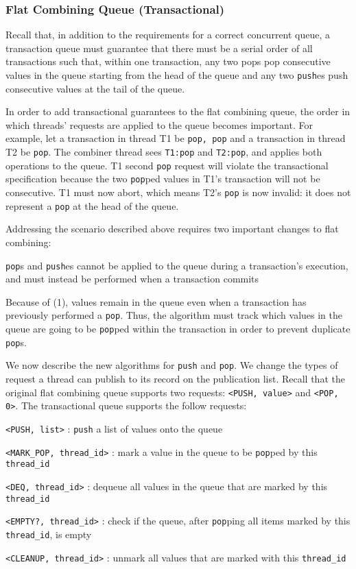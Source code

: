 \subsubsection{Flat Combining Queue (Transactional)}

Recall that, in addition to the requirements for a correct concurrent queue, a transaction queue must guarantee that there must be a serial order of all transactions such that, within one transaction, any two pops pop consecutive values in the queue starting from the head of the queue and any two \texttt{push}es push consecutive values at the tail of the queue.

In order to add transactional guarantees to the flat combining queue, the order in which threads’ requests are applied to the queue becomes important. For example, let a transaction in thread T1 be \texttt{pop, pop} and a transaction in thread T2 be \texttt{pop}. The combiner thread sees \texttt{T1:pop} and \texttt{T2:pop}, and applies both operations to the queue. T1 second \texttt{pop} request will violate the transactional specification because the two \texttt{pop}ped values in T1’s transaction will not be consecutive. T1 must now abort, which means T2’s \texttt{pop} is now invalid: it does not represent a \texttt{pop} at the head of the queue.

Addressing the scenario described above requires two important changes to flat combining: 
\begin{ordlist}
\item \texttt{pop}s and \texttt{push}es cannot be applied to the queue during a transaction’s execution, and must instead be performed when a transaction commits
\item Because of (1), values remain in the queue even when a transaction has previously performed a \texttt{pop}. Thus, the algorithm must track which values in the queue are going to be \texttt{pop}ped within the transaction in order to prevent duplicate \texttt{pop}s.
\end{ordlist}

We now describe the new algorithms for \texttt{push} and \texttt{pop}.  We change the types of request a thread can publish to its record on the publication list. Recall that the original flat combining queue supports two requests: \texttt{<PUSH, value>} and \texttt{<POP, 0>}. The transactional queue supports the follow requests:
\begin{bullets}
    \item \texttt{<PUSH, list>} : \texttt{push} a list of values onto the queue
    \item \texttt{<MARK\_POP, thread\_id>} : mark a value in the queue to be \texttt{pop}ped by this \texttt{thread\_id}
    \item \texttt{<DEQ, thread\_id>} : dequeue all values in the queue that are marked by this \texttt{thread\_id}
    \item \texttt{<EMPTY?, thread\_id>} : check if the queue, after \texttt{pop}ping all items marked by this \texttt{thread\_id}, is empty
    \item \texttt{<CLEANUP, thread\_id>} : unmark all values that are marked with this \texttt{thread\_id}
\end{bullets}


